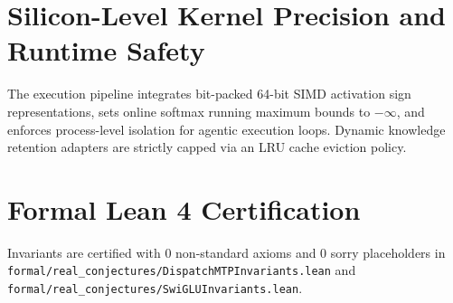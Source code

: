 \documentclass[11pt,a4paper]{article}
\begin{document}
\section{Silicon-Level Kernel Precision and Runtime Safety}
The execution pipeline integrates bit-packed 64-bit SIMD activation sign representations, sets online softmax running maximum bounds to $-\infty$, and enforces process-level isolation for agentic execution loops. Dynamic knowledge retention adapters are strictly capped via an LRU cache eviction policy.

\section{Formal Lean 4 Certification}
Invariants are certified with 0 non-standard axioms and 0 sorry placeholders in \texttt{formal/real\_conjectures/DispatchMTPInvariants.lean} and \texttt{formal/real\_conjectures/SwiGLUInvariants.lean}.
\end{document}
